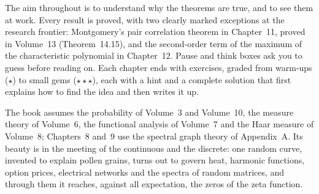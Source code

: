 The aim throughout is to understand why the theorems are true, and to see them at work. Every result is proved, with two
clearly marked exceptions at the research frontier: Montgomery's pair correlation theorem in Chapter~11, proved in Volume~13 (Theorem~14.15),
and the second-order term of the maximum of the characteristic polynomial in Chapter~12. Pause and think boxes ask you to guess
before reading on. Each chapter ends with exercises, graded from warm-ups ($\star$) to small gems ($\star\star\star$), each
with a hint and a complete solution that first explains how to find the idea and then writes it up.

The book assumes the probability of Volume~3 and Volume~10, the measure theory of Volume~6, the functional analysis of Volume~7 and
the Haar measure of Volume~8; Chapters~8 and~9 use the spectral graph theory of Appendix~A. Its beauty is in the meeting of the
continuous and the discrete: one random curve, invented to explain pollen grains, turns out to govern heat, harmonic functions,
option prices, electrical networks and the spectra of random matrices, and through them it reaches, against all expectation,
the zeros of the zeta function.
